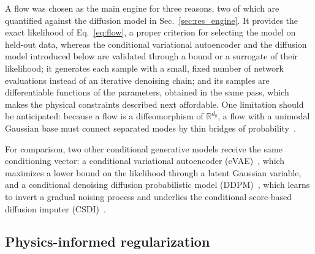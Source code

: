 A flow was chosen as the main engine for three reasons, two of which are quantified against the diffusion model in Sec.~\ref{sec:res_engine}. It provides the exact likelihood of Eq.~\eqref{eq:flow}, a proper criterion for selecting the model on held-out data, whereas the conditional variational autoencoder and the diffusion model introduced below are validated through a bound or a surrogate of their likelihood; it generates each sample with a small, fixed number of network evaluations instead of an iterative denoising chain; and its samples are differentiable functions of the parameters, obtained in the same pass, which makes the physical constraints described next affordable. One limitation should be anticipated: because a flow is a diffeomorphism of $\mathbb R^{d_y}$, a flow with a unimodal Gaussian base must connect separated modes by thin bridges of probability~\cite{Cornish2020}.

For comparison, two other conditional generative models receive the same conditioning vector: a conditional variational autoencoder (cVAE)~\cite{Kingma2014,Sohn2015}, which maximizes a lower bound on the likelihood through a latent Gaussian variable, and a conditional denoising diffusion probabilistic model (DDPM)~\cite{Ho2020,NicholDhariwal2021}, which learns to invert a gradual noising process and underlies the conditional score-based diffusion imputer (CSDI)~\cite{Tashiro2021}.

\subsection{Physics-informed regularization}\label{sec:physics_reg}

